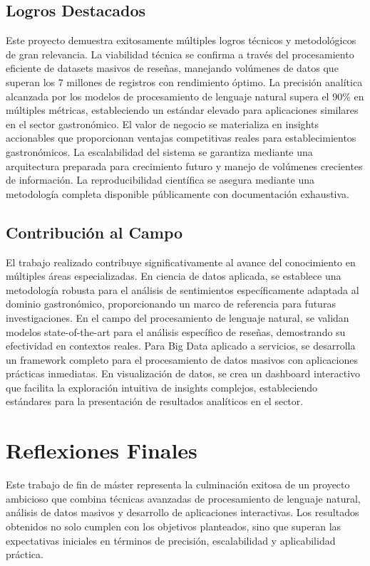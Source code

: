 \documentclass[12pt,a4paper,twoside,openany]{book}
\begin{document}
\subsection{Logros Destacados}

Este proyecto demuestra exitosamente múltiples logros técnicos y metodológicos de gran relevancia. La viabilidad técnica se confirma a través del procesamiento eficiente de datasets masivos de reseñas, manejando volúmenes de datos que superan los 7 millones de registros con rendimiento óptimo. La precisión analítica alcanzada por los modelos de procesamiento de lenguaje natural supera el 90\% en múltiples métricas, estableciendo un estándar elevado para aplicaciones similares en el sector gastronómico. El valor de negocio se materializa en insights accionables que proporcionan ventajas competitivas reales para establecimientos gastronómicos. La escalabilidad del sistema se garantiza mediante una arquitectura preparada para crecimiento futuro y manejo de volúmenes crecientes de información. La reproducibilidad científica se asegura mediante una metodología completa disponible públicamente con documentación exhaustiva.

\subsection{Contribución al Campo}

El trabajo realizado contribuye significativamente al avance del conocimiento en múltiples áreas especializadas. En ciencia de datos aplicada, se establece una metodología robusta para el análisis de sentimientos específicamente adaptada al dominio gastronómico, proporcionando un marco de referencia para futuras investigaciones. En el campo del procesamiento de lenguaje natural, se validan modelos state-of-the-art para el análisis específico de reseñas, demostrando su efectividad en contextos reales. Para Big Data aplicado a servicios, se desarrolla un framework completo para el procesamiento de datos masivos con aplicaciones prácticas inmediatas. En visualización de datos, se crea un dashboard interactivo que facilita la exploración intuitiva de insights complejos, estableciendo estándares para la presentación de resultados analíticos en el sector.


\section{Reflexiones Finales}

Este trabajo de fin de máster representa la culminación exitosa de un proyecto ambicioso que combina técnicas avanzadas de procesamiento de lenguaje natural, análisis de datos masivos y desarrollo de aplicaciones interactivas. Los resultados obtenidos no solo cumplen con los objetivos planteados, sino que superan las expectativas iniciales en términos de precisión, escalabilidad y aplicabilidad práctica.
\end{document}

